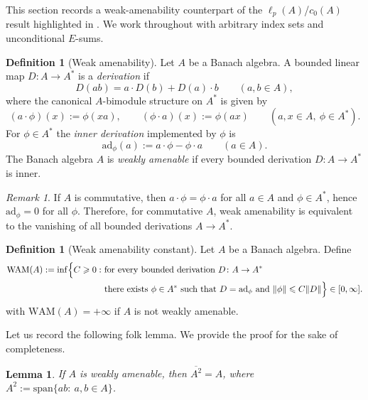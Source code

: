 \documentclass[reqno]{amsart}
\theoremstyle{plain}
\newtheorem{lemma}[theorem]{Lemma}
\theoremstyle{definition}
\newtheorem{definition}[theorem]{Definition}
\theoremstyle{remark}
\newtheorem{remark}[theorem]{Remark}
\renewcommand{\le}{\leqslant}
\renewcommand{\ge}{\geqslant}
\newcommand{\ad}{\mathrm{ad}}
\newcommand{\WAM}{\mathrm{WAM}}  %
\begin{document}
This section records a weak-amenability counterpart of the $\ell_p(A)$/$c_0(A)$ result
highlighted in \cite{KoczorowskiPiszczek2024WeakAmenability}.
We work throughout with arbitrary index sets and unconditional $E$-sums.

\begin{definition}[Weak amenability]\label{def:WA}
Let $A$ be a Banach algebra.
A bounded linear map $D\colon A\to A^*$ is a \emph{derivation} if
\[
D(ab)=a\cdot D(b)+D(a)\cdot b\qquad (a,b\in A),
\]
where the canonical $A$-bimodule structure on $A^*$ is given by
\[
(a\cdot\phi)(x):=\phi(xa),\qquad (\phi\cdot a)(x):=\phi(ax)
\qquad (a,x\in A,\ \phi\in A^*).
\]
For $\phi\in A^*$ the \emph{inner derivation} implemented by $\phi$ is
\[
\ad_\phi(a):=a\cdot\phi-\phi\cdot a\qquad (a\in A).
\]
The Banach algebra $A$ is \emph{weakly amenable} if every bounded derivation $D\colon A\to A^*$ is inner.
\end{definition}

\begin{remark}\label{rem:WA-commutative}
If $A$ is commutative, then $a\cdot\phi=\phi\cdot a$ for all $a\in A$ and $\phi\in A^*$, hence $\ad_\phi=0$ for all $\phi$.
Therefore, for commutative $A$, weak amenability is equivalent to the vanishing of all bounded derivations $A\to A^*$.
\end{remark}

\begin{definition}[Weak amenability constant]\label{def:WAM}
Let $A$ be a Banach algebra. Define
\[
\begin{split}
\WAM(A):=\inf\Bigl\{C\ge 0:\ &\text{for every bounded derivation }D\colon A\to A^*\\
&\text{there exists }\phi\in A^*\text{ such that }D=\ad_\phi
\text{ and }\|\phi\|\le C\|D\|\Bigr\}\in[0,\infty].
\end{split}
\]
with $\WAM(A)=+\infty$ if $A$ is not weakly amenable.
\end{definition}

Let us record the following folk lemma. We provide the proof for the sake of completeness.
\begin{lemma}\label{lem:WA-essential}
If $A$ is weakly amenable, then $\overline{A^2}=A$, where $A^2:=\mathrm{span}\{ab:\ a,b\in A\}$.
\end{lemma}
\end{document}
